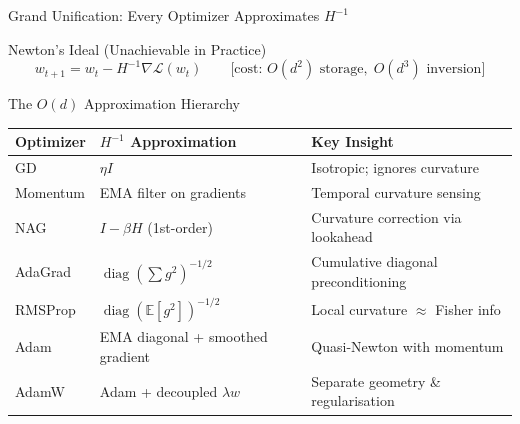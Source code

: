 \documentclass{beamer}
\begin{document}
\begin{frame}[shrink=10]{Grand Unification: Every Optimizer Approximates $H^{-1}$}
  \begin{block}{Newton's Ideal (Unachievable in Practice)}
    \[
      w_{t+1} = w_t - H^{-1}\nabla\mathcal{L}(w_t)
      \qquad
      \bigl[\text{cost: }O(d^2)\text{ storage},\;
             O(d^3)\text{ inversion}\bigr]
    \]
  \end{block}

  \medskip

  \begin{block}{The $O(d)$ Approximation Hierarchy}
    \centering
    \renewcommand{\arraystretch}{1.35}
    \begin{tabular}{lll}
      \toprule
      \textbf{Optimizer} & \textbf{$H^{-1}$ Approximation} & \textbf{Key Insight}\\
      \midrule
      GD       & $\eta I$                              & Isotropic; ignores curvature\\
      Momentum & EMA filter on gradients               & Temporal curvature sensing\\
      NAG      & $I - \beta H$ (1st-order)             & Curvature correction via lookahead\\
      AdaGrad  & $\operatorname{diag}(\textstyle\sum g^2)^{-1/2}$
                                                       & Cumulative diagonal preconditioning\\
      RMSProp  & $\operatorname{diag}(\mathbb{E}[g^2])^{-1/2}$
                                                       & Local curvature $\approx$ Fisher info\\
      Adam     & EMA diagonal + smoothed gradient      & Quasi-Newton with momentum\\
      AdamW    & Adam + decoupled $\lambda w$          & Separate geometry \& regularisation\\
      \bottomrule
    \end{tabular}
  \end{block}
\end{frame}
\end{document}
